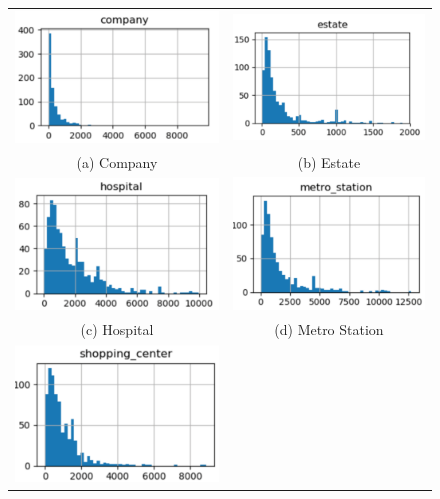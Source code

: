 \begin{figure}[!htbp]
	\begin{tabular}{cc}
		\includegraphics[width=0.45\columnwidth]{./figures/company.pdf} &  \includegraphics[width=0.45\columnwidth]{./figures/estate.pdf} \\
		(a) Company & (b) Estate \\[6pt] 
		\includegraphics[width=0.45\columnwidth]{./figures/hospital.pdf} &
		\includegraphics[width=0.45\columnwidth]{./figures/metro.pdf} \\
		(c) Hospital & (d) Metro Station \\
		\includegraphics[width=0.45\columnwidth]{./figures/shop.pdf} 

\end{tabular}
\end{figure}
